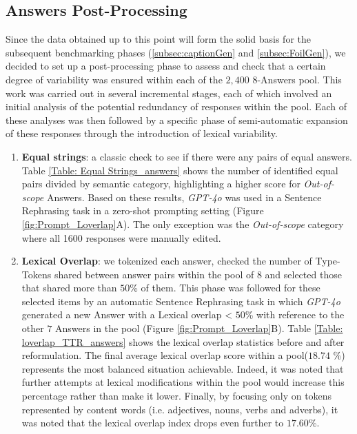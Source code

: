 \subsection{Answers Post-Processing}
\label{subsec: A_post_proc}
Since the data obtained up to this point will form the solid basis for the subsequent benchmarking phases (\ref{subsec:captionGen} and \ref{subsec:FoilGen}), we decided to set up a post-processing phase to assess and check that a certain degree of variability was ensured within each of the $2,400$ $8$-Answers pool.
This work was carried out in several incremental stages, each of which involved an initial analysis of the potential redundancy of responses within the pool. Each of these analyses was then followed by a specific phase of semi-automatic expansion of these responses through the introduction of lexical variability.
\begin{enumerate}
    \item \textbf{Equal strings}: a classic check to see if there were any pairs of equal answers. Table \ref{Table: Equal Strings_answers} shows the number of identified equal pairs divided by semantic category, highlighting a higher score for \textit{Out-of-scope} Answers. Based on these results, \textit{GPT-4o} was used in a Sentence Rephrasing task in a zero-shot prompting setting (Figure \ref{fig:Prompt_Loverlap}A). The only exception was the \textit{Out-of-scope} category where all 1600 responses were manually edited.
    \item \textbf{Lexical Overlap}: we tokenized each answer, checked the number of Type-Tokens shared between answer pairs within the pool of 8 and selected those that shared more than $50$\% of them. This phase was followed for these selected items by an automatic Sentence Rephrasing task in which \textit{GPT-4o} generated a new Answer with a Lexical overlap < $50$\% with reference to the other $7$ Answers in the pool (Figure \ref{fig:Prompt_Loverlap}B). Table \ref{Table: loverlap_TTR_answers} shows the lexical overlap statistics before and after reformulation. The final average lexical overlap score within a pool($18.74$ \%) represents the most balanced situation achievable. Indeed, it was noted that further attempts at lexical modifications within the pool would increase this percentage rather than make it lower. Finally, by focusing only on tokens represented by content words (i.e. adjectives, nouns, verbs and adverbs), it was noted that the lexical overlap index drops even further to $17.60$\%.
\end{enumerate}



